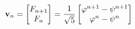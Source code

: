 \documentclass[preview]{standalone}
\begin{document}
\begin{align*}
\special{dvisvgm:raw <g id='unique000'>}\mathbf{v}_n = \begin{bmatrix} F_{n+1} \\ F_n \end{bmatrix}= \frac{1}{\sqrt{5}}\begin{bmatrix} \varphi^{n+1} - \psi^{n+1} \\ \varphi^n - \psi^n \end{bmatrix}\special{dvisvgm:raw </g>}
\end{align*}
\end{document}
